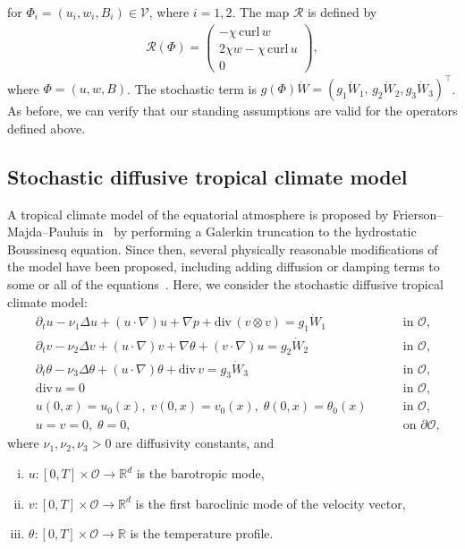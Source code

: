 \documentclass[11pt, reqno]{amsart}
\theoremstyle{definition}
\numberwithin{equation}{section}
\newcommand{\bb}{\mathbb}
\newcommand{\divg}{\mathrm{div}\,}
\newcommand{\curl}{\mathrm{curl}\,}
\begin{document}
for $\Phi_i=(u_i,w_i,B_i)\in \mathcal{V}$, where $i=1,2$. The map $\mathcal{R}$ is defined by
\begin{align*}
    \mathcal{R}(\Phi)= 
    \begin{pmatrix} -\chi \,\curl w \\[0.5ex] 2\chi w-\chi \,\curl u \\[0.5ex] 0 \end{pmatrix},
\end{align*}
where $\Phi=(u,w,B)$. The stochastic term is $g(\Phi)\dot{W}= (g_1\dot{W}_1,\, g_2\dot{W}_2, g_3\dot{W}_3)^\top$. As before, we can verify that our standing assumptions are valid for the operators defined above.


\subsection{Stochastic diffusive tropical climate model}\label{sec:climate}

A tropical climate model of the equatorial atmosphere is proposed by Frierson--Majda--Pauluis in~\cite{FriMajPau04} by performing a Galerkin truncation to the hydrostatic Boussinesq equation. Since then, several physically reasonable modifications of the model have been proposed, including adding diffusion or damping terms to some or all of the equations~\cite{LiTi16, Ye17}. Here, we consider the stochastic diffusive tropical climate model:
\begin{subequations}\label{equ:stc}
	\begin{alignat}{2}
		&\partial_t u - \nu_1 \Delta u + (u\cdot\nabla)u + \nabla p + \divg(v\otimes v) = g_1 \dot{W}_1
		\; && \quad\text{in $\mathscr{O}$,}
		\label{equ:stc a1}
        \\[1ex]
        \label{equ:stc a2}
        &\partial_t v - \nu_2 \Delta v + (u\cdot\nabla) v + \nabla\theta + (v\cdot\nabla)u = g_2 \dot{W}_2
        \; && \quad\text{in $\mathscr{O}$,}
		\\[1ex]
        \label{equ:stc a3}
        &\partial_t \theta - \nu_3 \Delta \theta + (u\cdot\nabla)\theta + \divg v = g_3\dot{W}_3
        \; && \quad\text{in $\mathscr{O}$,}
        \\[1ex]
		&\divg u = 0
		\; && \quad\text{in $\mathscr{O}$,}
		\label{equ:stc b}
		\\[1ex]
		&u(0,x)= u_0(x), \; v(0,x)= v_0(x), \; \theta(0,x)=\theta_0(x)
		\; && \quad\text{in $\mathscr{O}$,}
		\label{equ:stc c}
		\\[1ex]
		&u = v = 0,\; \theta=0,
		\; && \quad\text{on $\partial\mathscr{O}$,}
		\label{equ:stc d}
	\end{alignat}
\end{subequations}
where $\nu_1,\nu_2,\nu_3>0$ are diffusivity constants, and
\begin{enumerate}[(i)]
    \item $u:[0,T]\times \mathscr{O}\to \bb{R}^d$ is the barotropic mode,
    \item $v: [0,T]\times \mathscr{O}\to \bb{R}^d$ is the first baroclinic mode of the velocity vector,
    \item $\theta :[0,T] \times \mathscr{O} \to \bb{R}$ is the temperature profile.
\end{enumerate}
\end{document}
